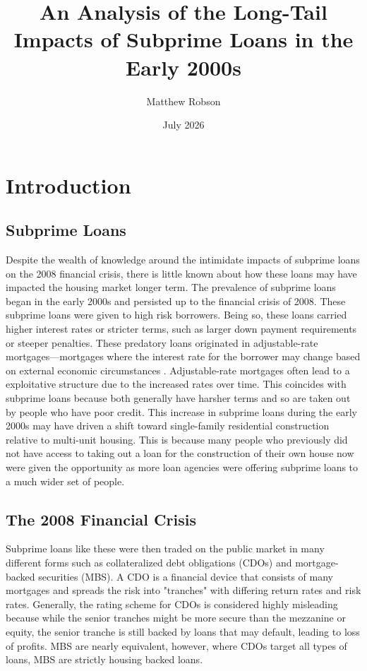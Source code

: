 \documentclass{article}
\title{An Analysis of the Long-Tail Impacts of Subprime Loans in the Early 2000s}
\author{Matthew Robson}
\date{July 2026}
\begin{document}
\maketitle

\section{Introduction}

\subsection{Subprime Loans}

 
 Despite the wealth of knowledge around the intimidate impacts of subprime loans on the 2008 financial crisis, there is little known about how these loans may have impacted the housing market longer term. The prevalence of subprime loans began in the early 2000s and persisted up to the financial crisis of 2008. These subprime loans were given to high risk borrowers. Being so, these loans carried higher interest rates or stricter terms, such as larger down payment requirements or steeper penalties. These predatory loans originated in adjustable-rate mortgages---mortgages where the interest rate for the borrower may change based on external economic circumstances \cite{duke_predatory_lending}. Adjustable-rate mortgages often lead to a exploitative structure due to the increased rates over time. This coincides with subprime loans because both generally have harsher terms and so are taken out by people who have poor credit. This increase in subprime loans during the early 2000s may have driven a shift toward single-family residential construction relative to multi-unit housing. This is because many people who previously did not have access to taking out a loan for the construction of their own house now were given the opportunity as more loan agencies were offering subprime loans to a much wider set of people.

\subsection{The 2008 Financial Crisis}

Subprime loans like these were then traded on the public market in many different forms such as collateralized debt obligations (CDOs) and mortgage-backed securities (MBS). A CDO is a financial device that consists of many mortgages and spreads the risk into "tranches" with differing return rates and risk rates. Generally, the rating scheme for CDOs is considered highly misleading because while the senior tranches might be more secure than the mezzanine or equity, the senior tranche is still backed by loans that may default, leading to loss of profits. MBS are nearly equivalent, however, where CDOs target all types of loans, MBS are strictly housing backed loans. 
\end{document}

